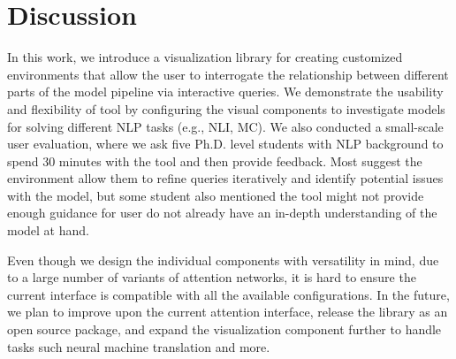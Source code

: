 \section{Discussion}
In this work, we introduce a visualization library for creating customized environments that allow the user to interrogate the relationship between different parts of the model pipeline via interactive queries.
%
We demonstrate the usability and flexibility of tool by configuring the visual components to investigate models for solving different NLP tasks (e.g., NLI, MC).
%
We also conducted a small-scale user evaluation, where we ask five Ph.D. level students with NLP background to spend 30 minutes with the tool and then provide feedback. Most suggest the environment allow them to refine queries iteratively and identify potential issues with the model, but some student also mentioned the tool might not provide enough guidance for user do not already have an in-depth understanding of the model at hand.

Even though we design the individual components with versatility in mind, due to a large number of variants of attention networks, it is hard to ensure the current interface is compatible with all the available configurations.
%
In the future, we plan to improve upon the current attention interface, release the library as an open source package, and expand the visualization component further to handle tasks such neural machine translation and more. 
